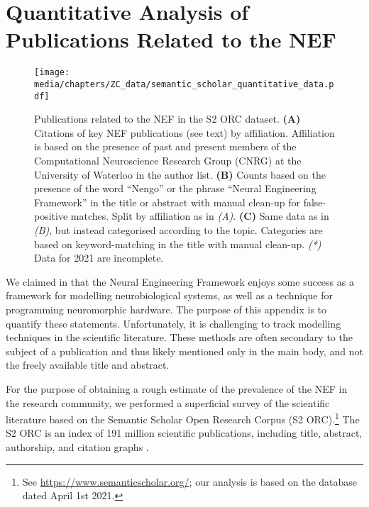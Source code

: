 \section{Quantitative Analysis of Publications Related to the NEF}
\label{app:nef_literature}

\begin{figure}[p]
	\centering
	\texttt{[image: media/chapters/ZC\_data/semantic\_scholar\_quantitative\_data.pdf]}%
	{\label{fig:nef_literature_a}}%
	{\label{fig:nef_literature_b}}%
	{\label{fig:nef_literature_c}}%
	\caption[Publications related to the NEF in the S2 ORC dataset]{Publications related to the NEF in the S2 ORC dataset.
	\textbf{(A)} Citations of key NEF publications (see text) by affiliation. Affiliation is based on the presence of past and present members of the Computational Neuroscience Research Group (CNRG) at the University of Waterloo in the author list.
	\textbf{(B)} Counts based on the presence of the word \enquote{Nengo} or the phrase \enquote{Neural Engineering Framework} in the title or abstract with manual clean-up for false-positive matches. Split by affiliation as in \emph{(A)}.
	\textbf{(C)} Same data as in \emph{(B)}, but instead categorised according to the topic. Categories are based on keyword-matching in the title with manual clean-up.
	\emph{(*)} Data for 2021 are incomplete.}
	\label{fig:nef_literature}
\end{figure}

We claimed in  that the Neural Engineering Framework enjoys some success as a framework for modelling neurobiological systems, as well as a technique for programming neuromorphic hardware.
The purpose of this appendix is to quantify these statements.
Unfortunately, it is challenging to track modelling techniques in the scientific literature.
These methods are often secondary to the subject of a publication and thus likely mentioned only in the main body, and not the freely available title and abstract.

For the purpose of obtaining a rough estimate of the prevalence of the NEF in the research community, we performed a superficial survey of the scientific literature based on the Semantic Scholar Open Research Corpus (S2 ORC).\footnote{See \url{https://www.semanticscholar.org/}; our analysis is based on the database dated April 1st 2021.}
The S2 ORC is an index of 191 million scientific publications, including title, abstract, authorship, and citation graphs \citep{ammar2018construction}.

